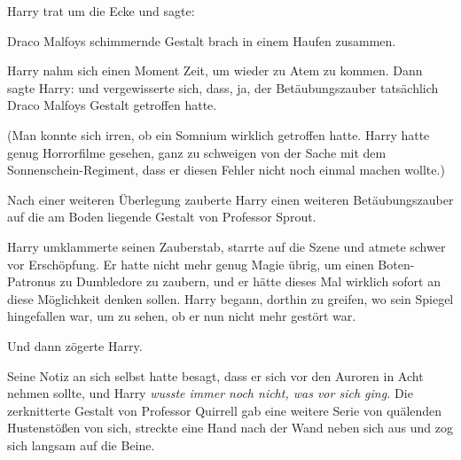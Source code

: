 Harry trat um die Ecke und sagte: 

Draco Malfoys schimmernde Gestalt brach in einem Haufen zusammen.

Harry nahm sich einen Moment Zeit, um wieder zu Atem zu kommen. Dann sagte Harry:  und vergewisserte sich, dass, ja, der Betäubungszauber tatsächlich Draco Malfoys Gestalt getroffen hatte.

(Man konnte sich irren, ob ein Somnium wirklich getroffen hatte. Harry hatte genug Horrorfilme gesehen, ganz zu schweigen von der Sache mit dem Sonnenschein-Regiment, dass er diesen Fehler nicht noch einmal machen wollte.)

Nach einer weiteren Überlegung zauberte Harry einen weiteren Betäubungszauber auf die am Boden liegende Gestalt von Professor Sprout.

Harry umklammerte seinen Zauberstab, starrte auf die Szene und atmete schwer vor Erschöpfung. Er hatte nicht mehr genug Magie übrig, um einen Boten-Patronus zu Dumbledore zu zaubern, und er hätte dieses Mal wirklich sofort an diese Möglichkeit denken sollen. Harry begann, dorthin zu greifen, wo sein Spiegel hingefallen war, um zu sehen, ob er nun nicht mehr gestört war.

Und dann zögerte Harry.


Seine Notiz an sich selbst hatte besagt, dass er sich vor den Auroren in Acht nehmen sollte, und Harry \emph{wusste immer noch nicht, was vor sich ging.}
Die zerknitterte Gestalt von Professor Quirrell gab eine weitere Serie von quälenden Hustenstößen von sich, streckte eine Hand nach der Wand neben sich aus und zog sich langsam auf die Beine.

